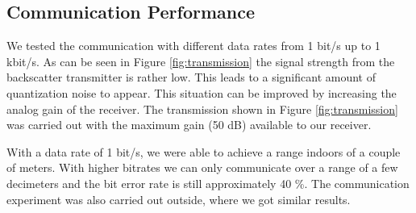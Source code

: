 \begin{figure}[h]
\label{fig:haversine}
\end{figure}

\balance

\subsection{Communication Performance}
We tested the communication with different data rates from 1 bit/s up to
1 kbit/s. As can be seen in Figure \ref{fig:transmission} the signal
strength from the backscatter transmitter is rather low. This leads to a
significant amount of quantization noise to appear. This situation can
be improved by increasing the analog gain of the receiver. The
transmission shown in Figure \ref{fig:transmission} was carried out with
the maximum gain (50 dB) available to our receiver. 

With a data rate of 1 bit/s, we were able to achieve a range indoors
of a couple of meters. With higher bitrates we
can only communicate over a range of a few decimeters and the 
bit error rate is still approximately 40 \%. The communication
experiment was also carried out outside, where we got similar results.  
